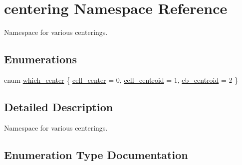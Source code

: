 \hypertarget{namespacecentering}{}\section{centering Namespace Reference}
\label{namespacecentering}


Namespace for various centerings.  


\subsection*{Enumerations}
\begin{DoxyCompactItemize}
\item 
enum \hyperlink{namespacecentering_a2cba3891fbdab30a214ce001478b0c00}{which\+\_\+center} \{ \hyperlink{namespacecentering_a2cba3891fbdab30a214ce001478b0c00aca41040d7706c3402b16d9d07695f56c}{cell\+\_\+center} = 0, 
\hyperlink{namespacecentering_a2cba3891fbdab30a214ce001478b0c00a6e1064821a3e1a725167a8c0eec42c51}{cell\+\_\+centroid} = 1, 
\hyperlink{namespacecentering_a2cba3891fbdab30a214ce001478b0c00a78df87c9308832cc94b8dc4dfaf89cdd}{eb\+\_\+centroid} = 2
 \}
\end{DoxyCompactItemize}


\subsection{Detailed Description}
Namespace for various centerings. 

\subsection{Enumeration Type Documentation}

